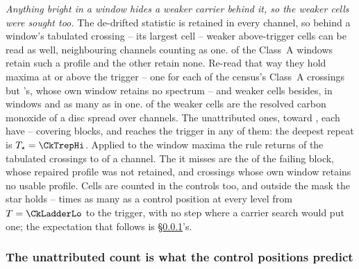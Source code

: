 \emph{Anything bright in a window hides a weaker carrier behind it, so the
weaker cells were sought too.} The de-drifted statistic is retained in every
channel, so behind a window's tabulated crossing -- its largest cell --
weaker above-trigger cells can be read as well, neighbouring channels counting
as one. \CkNWin{} of the \NWinA{} Class~A windows retain such a profile and the
other \CkNWinNotCov{} retain none. Re-read that way they hold \CkNPrimary{}
maxima at or above the trigger -- one for each of the census's
\CkNCrossCenA{} Class~A crossings but \CkMissStar's, whose own window retains
no spectrum -- and \CkNSecondaryWord{} weaker cells besides, in \CkNSecWin{}
windows and as many as \CkNSecMax{} in one. \CkNSecAttr{} of the weaker cells
are the resolved carbon monoxide of a disc spread over channels. The
\CkNSecUnattrWord{} unattributed ones, toward \CkSecStars, each have
\CkCovLo--\CkCovHi{} covering blocks, and \CkNRecurWord{} reaches the trigger
in any of them: the deepest repeat is $T_\star=\CkTrepHi$. Applied to the window maxima the rule returns \CkRegN{} of the
\EvNCrossRaw{} tabulated crossings to \CkRegDev{} of a channel. The
\CkRegMiss{} it misses are the \EvNCrossFlag{} of the failing block, whose
repaired profile was not retained, and crossings whose own window retains no
usable profile.
Cells are counted in the controls too, and outside the mask the star holds
\CkRatioLo--\CkRatioHi{} times as many as a control position at every level
from $T=\CkLadderLo$ to the trigger, with no step where a carrier search would
put one; the expectation that follows is \S\ref{sec:trigunif}'s.

\subsubsection{The unattributed count is what the control positions predict}
\label{sec:trigunif}

